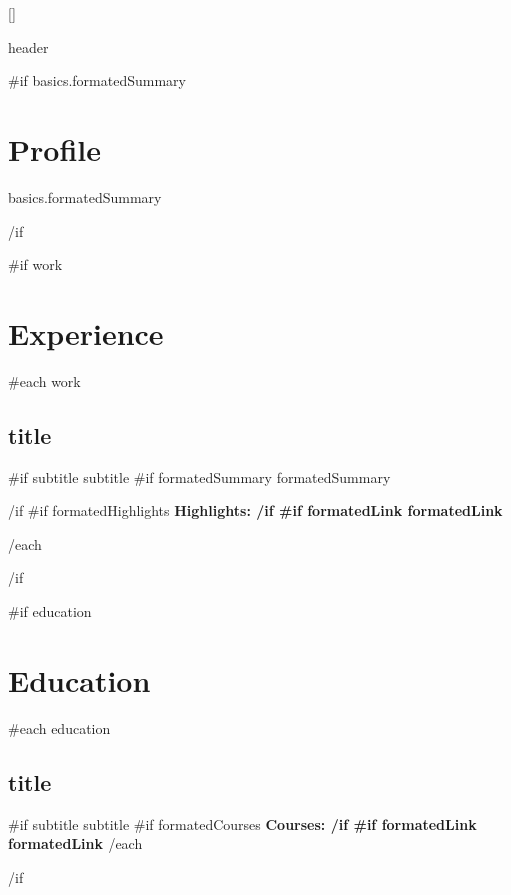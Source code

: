 \documentclass{article}
\begin{document}
\color{primary-950}
\titleformat{\section}{\color{accent}\raggedright\normalsize\bfseries\uppercase}{}{0ex}{}[{\titlerule[0.8pt]}]

{{ header }}

{{#if basics.formatedSummary}}\section*{Profile} {
  {{ basics.formatedSummary }}
  \par
}{{/if}}\ignorespaces

{{#if work}}
\section*{Experience} {
  {{#each work}}
    \subsection*{ {{ title }} } {
      {{#if subtitle}}{{ subtitle }} \ignorespaces
      {{#if formatedSummary}}
        {{ formatedSummary }} 
        \par
      {{/if}}\ignorespaces
      {{#if formatedHighlights}}
        \bfseries Highlights: \newline
      {{/if}}\ignorespaces
      {{#if formatedLink}}{{ formatedLink }}\ignorespaces
    }
  {{/each}}
}
{{/if}}\ignorespaces

{{#if education}}\section*{Education}{
  {{#each education}}
    \subsection*{ {{ title }} } {
      {{#if subtitle}}{{ subtitle }} \ignorespaces
      {{#if formatedCourses}}
        \bfseries Courses: \newline
      {{/if}}\ignorespaces
      {{#if formatedLink}}{{ formatedLink }}\ignorespaces
    }
  {{/each}}
}{{/if}}\ignorespaces
\end{document}
